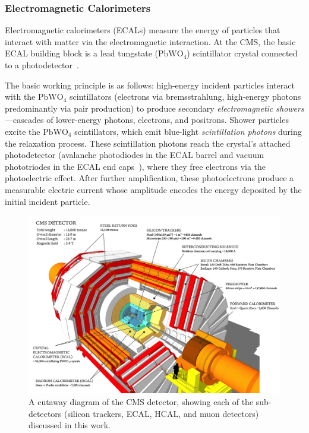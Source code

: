 \documentclass[11pt, a4paper]{article}
\newcommand{\chem}[1]{\ensuremath{\mathrm{#1}}}  %
\begin{document}
\subsubsection{Electromagnetic Calorimeters}
Electromagnetic calorimeters (ECALs) measure the energy of particles that interact with matter via the electromagnetic interaction.
At the CMS, the basic ECAL building block is a lead tungstate (\chem{PbWO_4}) scintillator crystal connected to a photodetector~\cite{ecal-tdr}.

The basic working principle is as follows: high-energy incident particles interact with the \chem{PbWO_4} scintillators (electrons via bremsstrahlung, high-energy photons predominantly via pair production) to produce secondary \textit{electromagnetic showers}---cascades of lower-energy photons, electrons, and positrons.
Shower particles excite the \chem{PbWO_4} scintillators, which emit blue-light \textit{scintillation photons} during the relaxation process.
These scintillation photons reach the crystal's attached photodetector (avalanche photodiodes in the ECAL barrel and vacuum phototriodes in the ECAL end caps~\cite{ecal-tdr}), where they free electrons via the photoelectric effect.
After further amplification, these photoelectrons produce a measurable electric current whose amplitude encodes the energy deposited by the initial incident particle.

\begin{figure}[htb!]
    \centering
    \includegraphics[width=0.9\linewidth]{raster/png/cms.png}
    \caption{A cutaway diagram of the CMS detector, showing each of the sub-detectors (silicon trackers, ECAL, HCAL, and muon detectors) discussed in this work.
   ~\cite{image-cms}}
    \label{fig:cms}
\end{figure}
\end{document}
